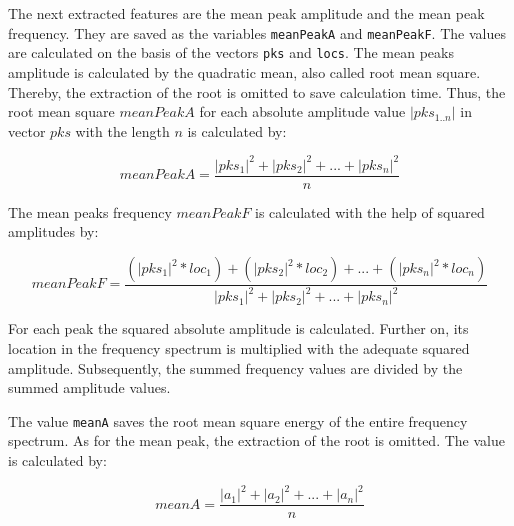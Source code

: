The next extracted features are the mean peak amplitude and the mean peak frequency. They are saved as the variables \lstinline{meanPeakA} and \lstinline{meanPeakF}. The values are calculated on the basis of the vectors \lstinline{pks} and \lstinline{locs}. The mean peaks amplitude is calculated by the quadratic mean, also called root mean square. Thereby, the extraction of the root is omitted to save calculation time. Thus, the root mean square $meanPeakA$ for each absolute amplitude value $|pks_{1..n}|$ in vector $pks$ with the length $n$ is calculated by:

\begin{equation}
	meanPeakA = \frac{|pks_1|^2+|pks_2|^2+...+|pks_n|^2}{n}
\end{equation}

The mean peaks frequency $meanPeakF$ is calculated with the help of squared amplitudes by:

\begin{equation}
	meanPeakF = \frac{(|pks_1|^2*loc_1)+(|pks_2|^2*loc_2)+...+(|pks_n|^2*loc_n)}{|pks_1|^2+|pks_2|^2+...+|pks_n|^2}
\end{equation}

For each peak the squared absolute amplitude is calculated. Further on, its location in the frequency spectrum is multiplied with the adequate squared amplitude. Subsequently, the summed frequency values are divided by the summed amplitude values.

The value \lstinline{meanA} saves the root mean square energy of the entire frequency spectrum. As for the mean peak, the extraction of the root is omitted. The value is calculated by:

\begin{equation}
	meanA = \frac{|a_1|^2+|a_2|^2+...+|a_n|^2}{n}
\end{equation}

